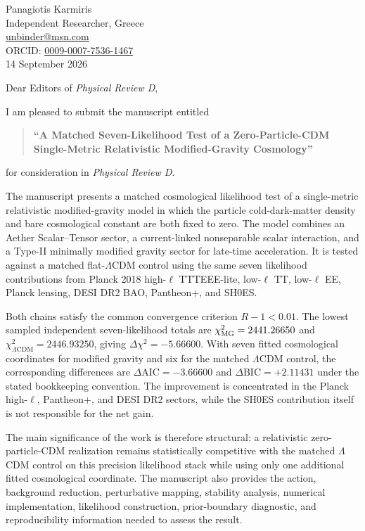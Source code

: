\documentclass[11pt]{article}
\begin{document}
\begin{flushright}
Panagiotis Karmiris\\
Independent Researcher, Greece\\
\href{mailto:unbinder@msn.com}{unbinder@msn.com}\\
ORCID: \href{https://orcid.org/0009-0007-7536-1467}{0009-0007-7536-1467}\\
14 September 2026
\end{flushright}

\vspace{1em}

Dear Editors of \textit{Physical Review D},

I am pleased to submit the manuscript entitled

\begin{quote}
\textbf{``A Matched Seven-Likelihood Test of a Zero-Particle-CDM Single-Metric Relativistic Modified-Gravity Cosmology''}
\end{quote}

for consideration in \textit{Physical Review D}.

The manuscript presents a matched cosmological likelihood test of a single-metric relativistic modified-gravity model in which the particle cold-dark-matter density and bare cosmological constant are both fixed to zero. The model combines an Aether Scalar--Tensor sector, a current-linked nonseparable scalar interaction, and a Type-II minimally modified gravity sector for late-time acceleration. It is tested against a matched flat-$\Lambda$CDM control using the same seven likelihood contributions from Planck 2018 high-$\ell$ TTTEEE-lite, low-$\ell$ TT, low-$\ell$ EE, Planck lensing, DESI DR2 BAO, Pantheon+, and SH0ES.

Both chains satisfy the common convergence criterion $R-1<0.01$. The lowest sampled independent seven-likelihood totals are $\chi^2_{\rm MG}=2441.26650$ and $\chi^2_{\Lambda\mathrm{CDM}}=2446.93250$, giving $\Delta\chi^2=-5.66600$. With seven fitted cosmological coordinates for modified gravity and six for the matched $\Lambda$CDM control, the corresponding differences are $\Delta\mathrm{AIC}=-3.66600$ and $\Delta\mathrm{BIC}=+2.11431$ under the stated bookkeeping convention. The improvement is concentrated in the Planck high-$\ell$, Pantheon+, and DESI DR2 sectors, while the SH0ES contribution itself is not responsible for the net gain.

The main significance of the work is therefore structural: a relativistic zero-particle-CDM realization remains statistically competitive with the matched $\Lambda$CDM control on this precision likelihood stack while using only one additional fitted cosmological coordinate. The manuscript also provides the action, background reduction, perturbative mapping, stability analysis, numerical implementation, likelihood construction, prior-boundary diagnostic, and reproducibility information needed to assess the result.
\end{document}
